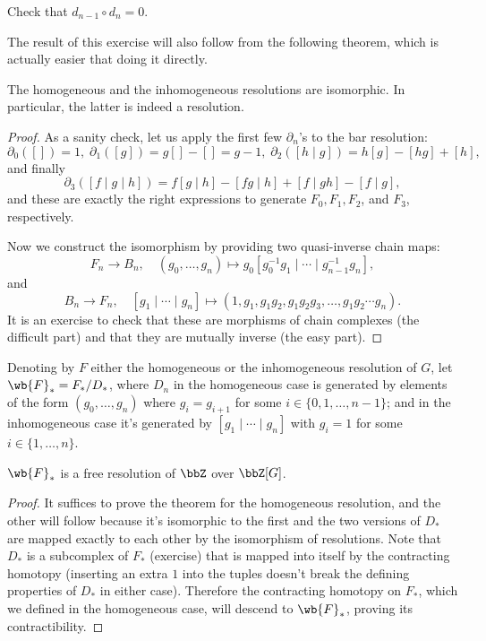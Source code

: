 \begin{xca}
    Check that $d_{n-1}\circ d_n=0$.
\end{xca}

The result of this exercise will also follow from the following theorem, which is actually easier that doing it directly.

\begin{thm}
    The homogeneous and the inhomogeneous resolutions are isomorphic. In particular, the latter is indeed a resolution.
\end{thm}
\begin{proof}
    As a sanity check, let us apply the first few $\partial_n$'s to the bar resolution:
    \[\partial_0([])=1,\; \partial_1([g])=g[]-[]=g-1,\; \partial_2([h\mid g])=h[g]-[hg]+[h],\] 
    and finally
    \[\partial_3([f\mid g\mid h])=f[g\mid h]-[fg\mid h]+[f\mid gh]-[f\mid g],\]
    and these are exactly the right expressions to generate $F_0,F_1,F_2$, and $F_3$, respectively.

    Now we construct the isomorphism by providing two quasi-inverse chain maps:
    \[F_n\to B_n,\quad (g_0,\ldots,g_n)\mapsto g_0[g_0^{-1}g_1\mid\cdots\mid g_{n-1}^{-1}g_n],\]
    and 
    \[B_n\to F_n,\quad [g_1\mid\cdots\mid g_n]\mapsto (1,g_1,g_1g_2,g_1g_2g_3,\ldots,g_1g_2\cdots g_n).\]
    It is an exercise to check that these are morphisms of chain complexes (the difficult part) and that they are mutually inverse (the easy part).
\end{proof}

\begin{defn}
    Denoting by $F$ either the homogeneous or the inhomogeneous resolution of $G$, let $\wb{F}_\ast=F_\ast\slash D_\ast$, where $D_n$ in the homogeneous case is generated by elements of the form $(g_0,\ldots,g_n)$ where $g_i=g_{i+1}$ for some $i\in\{0,1,\ldots,n-1\}$; and in the inhomogeneous case it's generated by $[g_1\mid\cdots\mid g_n]$ with $g_i=1$ for some $i\in\{1,\ldots,n\}$.
\end{defn}
\begin{thm}
    $\wb{F}_\ast$ is a free resolution of $\bbZ$ over $\bbZ[G]$.
\end{thm}
\begin{proof}
    It suffices to prove the theorem for the homogeneous resolution, and the other will follow because it's isomorphic to the first and the two versions of $D_\ast$ are mapped exactly to each other by the isomorphism of resolutions. Note that $D_\ast$ is a subcomplex of $F_\ast$ (exercise) that is mapped into itself by the contracting homotopy (inserting an extra $1$ into the tuples doesn't break the defining properties of $D_\ast$ in either case). Therefore the contracting homotopy on $F_\ast$, which we defined in the homogeneous case, will descend to $\wb{F}_\ast$, proving its contractibility.
\end{proof}





